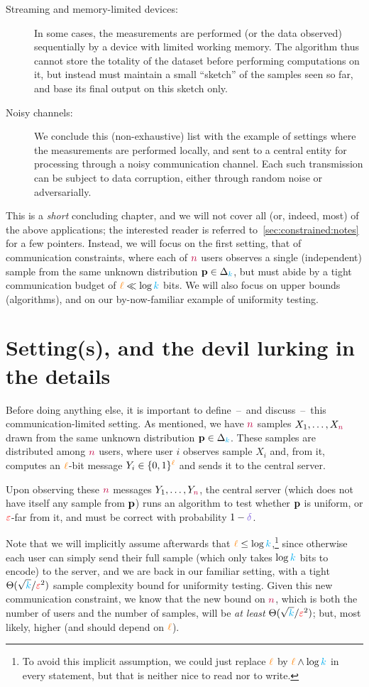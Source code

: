 \begin{description}
	\item[Streaming and memory-limited devices:] In some cases, the measurements are performed (or the data observed) sequentially by a device with limited working memory. The algorithm thus cannot store the totality of the dataset before performing computations on it, but instead must maintain a small ``sketch'' of the samples seen so far, and base its final output on this sketch only.
	\item[Noisy channels:] We conclude this (non-exhaustive) list with the example of settings where the measurements are performed locally, and sent to a central entity for processing through a noisy communication channel. Each such transmission can be subject to data corruption, either through random noise or adversarially.
\end{description}
This is a \emph{short} concluding chapter, and we will not cover all (or, indeed, most) of the above applications; the interested reader is referred to~\cref{sec:constrained:notes} for a few pointers. Instead, we will focus on the first setting, that of communication constraints, where each of ${\textcolor{purple}{n}}$ users observes a single (independent) sample from the same unknown distribution $\mathbf{p}\in\Delta_{{\textcolor{cyan}{k}}}$, but must abide by a tight communication budget of ${\textcolor{orange}{\ell}} \ll \log{\textcolor{cyan}{k}}$ bits. We will also focus on upper bounds (algorithms), and on our by-now-familiar example of uniformity testing.

\section{Setting(s), and the devil lurking in the details}
Before doing anything else, it is important to define~--~and discuss~--~this communication-limited setting. As mentioned, we have ${\textcolor{purple}{n}}$ \iid samples $X_1,\dots,X_{\textcolor{purple}{n}}$ drawn from the same unknown distribution $\mathbf{p}\in\Delta_{{\textcolor{cyan}{k}}}$. These samples are distributed among ${\textcolor{purple}{n}}$ users, where user $i$ observes sample $X_i$ and, from it, computes an ${\textcolor{orange}{\ell}}$-bit message $Y_i\in\{0,1\}^{\textcolor{orange}{\ell}}$ and sends it to the central server.

Upon observing these ${\textcolor{purple}{n}}$ messages $Y_1,\dots, Y_{\textcolor{purple}{n}}$, the central server (which does not have itself any sample from $\mathbf{p}$) runs an algorithm to test whether $\mathbf{p}$ is uniform, or $\textcolor{red}{\varepsilon}$-far from it, and must be correct with probability $1-\errprob$. 

Note that we will implicitly assume afterwards that ${\textcolor{orange}{\ell}}\leq \log{\textcolor{cyan}{k}}$,\footnote{To avoid this implicit assumption, we could just replace ${\textcolor{orange}{\ell}}$ by ${\textcolor{orange}{\ell}}\land\log{\textcolor{cyan}{k}}$ in every statement, but that is neither nice to read nor to write.} since otherwise each user can simply send their full sample (which only takes $\log{\textcolor{cyan}{k}}$ bits to encode) to the server, and we are back in our familiar setting, with a tight $\Theta(\sqrt{{\textcolor{cyan}{k}}}/\textcolor{red}{\varepsilon}^2)$ sample complexity bound for uniformity testing. Given this new communication constraint, we know that the new bound on ${\textcolor{purple}{n}}$, which is both the number of users and the number of samples, will be \emph{at least} $\Theta(\sqrt{{\textcolor{cyan}{k}}}/\textcolor{red}{\varepsilon}^2)$; but, most likely, higher (and should depend on ${\textcolor{orange}{\ell}}$).

